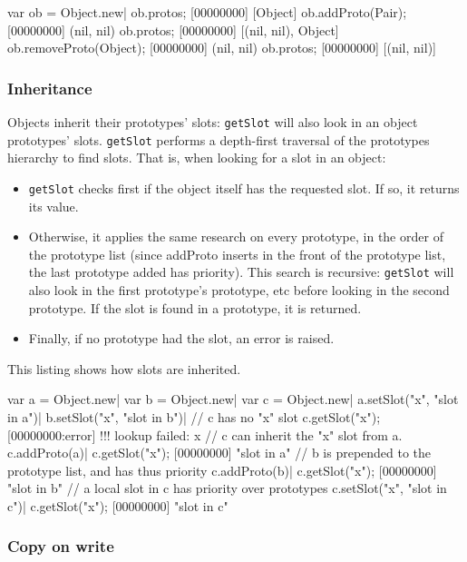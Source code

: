\begin{urbiscript}[firstnumber=last]
var ob = Object.new|
ob.protos;
[00000000] [Object]
ob.addProto(Pair);
[00000000] (nil, nil)
ob.protos;
[00000000] [(nil, nil), Object]
ob.removeProto(Object);
[00000000] (nil, nil)
ob.protos;
[00000000] [(nil, nil)]
\end{urbiscript}

\subsubsection{Inheritance}

Objects inherit their prototypes' slots: \lstinline|getSlot| will also
look in an object prototypes' slots. \lstinline|getSlot| performs a
depth-first traversal of the prototypes hierarchy to find slots. That
is, when looking for a slot in an object:

\begin{itemize}
\item \lstinline|getSlot| checks first if the object itself has the
  requested slot. If so, it returns its value.
\item Otherwise, it applies the same research on every prototype, in
  the order of the prototype list (since addProto inserts in the front
  of the prototype list, the last prototype added has priority). This
  search is recursive: \lstinline|getSlot| will also look in the first
  prototype's prototype, etc before looking in the second
  prototype. If the slot is found in a prototype, it is returned.
\item Finally, if no prototype had the slot, an error is raised.
\end{itemize}

This listing shows how slots are inherited.

\begin{urbiscript}[firstnumber=last]
var a = Object.new|
var b = Object.new|
var c = Object.new|
a.setSlot("x", "slot in a")|
b.setSlot("x", "slot in b")|
// c has no "x" slot
c.getSlot("x");
[00000000:error] !!! lookup failed: x
// c can inherit the "x" slot from a.
c.addProto(a)|
c.getSlot("x");
[00000000] "slot in a"
// b is prepended to the prototype list, and has thus priority
c.addProto(b)|
c.getSlot("x");
[00000000] "slot in b"
// a local slot in c has priority over prototypes
c.setSlot("x", "slot in c")|
c.getSlot("x");
[00000000] "slot in c"
\end{urbiscript}

\subsubsection{Copy on write}

